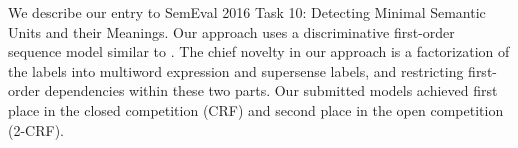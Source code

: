 We describe our entry to  SemEval 2016 Task 10: Detecting Minimal Semantic Units and their Meanings.  Our approach uses a discriminative first-order sequence model similar to .  The chief novelty in our approach is a factorization of the labels into multiword expression and supersense labels, and restricting first-order dependencies within these two parts.                          Our submitted models achieved first place in the closed competition (CRF) and second place in the open competition (2-CRF).
